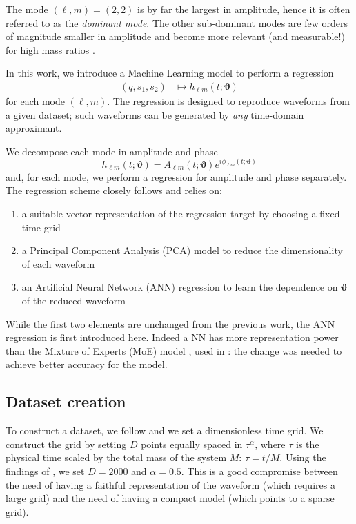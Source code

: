 \documentclass[twocolumn,showpacs,preprintnumbers,nofootinbib,prd,
superscriptaddress,10pt]{revtex4-1}
\begin{document}
The mode $(\ell, m) = (2,2)$ is by far the largest in amplitude, hence it is often referred to as the {\it dominant mode}. The other sub-dominant modes are few orders of magnitude smaller in amplitude and become more relevant (and measurable!) for high mass ratios \cite{}.

In this work, we introduce a Machine Learning model to perform a regression
\begin{align}\label{eq:objective}
	(q, s_1, s_2) &\longmapsto h_{\ell m}(t; \boldsymbol{\vartheta})
\end{align}
for each mode $(\ell,m)$.
The regression is designed to reproduce waveforms from a given dataset; such waveforms can be generated by {\it any} time-domain approximant.

We decompose each mode in amplitude and phase
\begin{equation}
	h_{\ell m}(t; \boldsymbol{\vartheta}) = A_{\ell m}(t; \boldsymbol{\vartheta}) e^{i \phi_{\ell m}(t; \boldsymbol{\vartheta})}
\end{equation}
and, for each mode, we perform a regression for amplitude and phase separately. The regression scheme closely follows \cite{Schmidt:2020yuu} and relies on:
\begin{enumerate}[label=(\alph*)]
	\item a suitable vector representation of the regression target by choosing a fixed time grid
	\item a Principal Component Analysis (PCA) model to reduce the dimensionality of each waveform
	\item an Artificial Neural Network (ANN) regression to learn the dependence on $\boldsymbol{\vartheta}$ of the reduced waveform
\end{enumerate}

While the first two elements are unchanged from the previous work, the ANN regression is first introduced here. Indeed a NN has more representation power than the Mixture of Experts (MoE) model \cite{Jacobs1991AdaptiveMoE}, used in \cite{Schmidt:2020yuu}: the change was needed to achieve better accuracy for the model.

\subsection{Dataset creation}
\label{sec:dataset}

To construct a dataset, we follow \cite{Schmidt:2020yuu} and we set a dimensionless time grid. We construct the grid by setting $D$ points equally spaced in $\tau^\alpha$, where $\tau$ is the physical time scaled by the total mass of the system $M$: $\tau = t/M$. Using the findings of \cite{Schmidt:2020yuu}, we set $D = \text{2000}$ and $\alpha = \text{0.5}$.
%
This is a good compromise between the need of having a faithful representation of the waveform (which requires a large grid) and the need of having a compact model (which points to a sparse grid).
\end{document}

